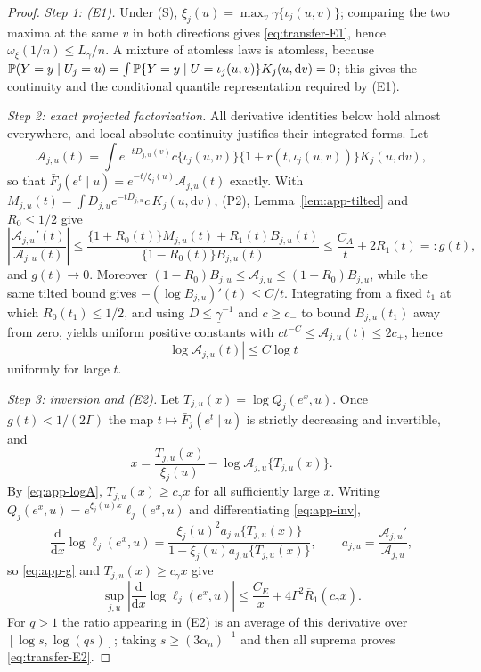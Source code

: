 \begin{proof}
\emph{Step 1: (E1).} Under (S), $\xi_j(u)=\max_v\gamma\{\iota_j(u,v)\}$;
comparing the two maxima at the same $v$ in both directions gives
\eqref{eq:transfer-E1}, hence $\omega_\xi(1/n)\le L_\gamma/n$. A mixture
of atomless laws is atomless, because
$\mathbb P(Y=y\mid U_j=u)=\int\mathbb P\{Y=y\mid U=\iota_j(u,v)\}K_j(u,\mathrm dv)=0$;
this gives the continuity and the conditional quantile representation
required by (E1).

\emph{Step 2: exact projected factorization.} All derivative identities
below hold almost everywhere, and local absolute continuity justifies
their integrated forms. Let
\[
 \mathcal A_{j,u}(t)=\int e^{-tD_{j,u}(v)}c\{\iota_j(u,v)\}
 \{1+r(t,\iota_j(u,v))\}K_j(u,\mathrm dv),
\]
so that $\bar F_j(e^t\mid u)=e^{-t/\xi_j(u)}\mathcal A_{j,u}(t)$
exactly. With $M_{j,u}(t)=\int D_{j,u}e^{-tD_{j,u}}c\,K_j(u,\mathrm dv)$,
(P2), Lemma~\ref{lem:app-tilted} and $R_0\le1/2$ give
\begin{equation}\label{eq:app-g}
 \left|\frac{\mathcal A_{j,u}'(t)}{\mathcal A_{j,u}(t)}\right|
 \le\frac{\{1+R_0(t)\}M_{j,u}(t)+R_1(t)B_{j,u}(t)}
         {\{1-R_0(t)\}B_{j,u}(t)}
 \le\frac{C_A}{t}+2R_1(t)=:g(t),
\end{equation}
and $g(t)\to0$. Moreover
$(1-R_0)B_{j,u}\le\mathcal A_{j,u}\le(1+R_0)B_{j,u}$, while the same
tilted bound gives $-(\log B_{j,u})'(t)\le C/t$. Integrating from a
fixed $t_1$ at which $R_0(t_1)\le1/2$, and using $D\le\underline\gamma^{-1}$
and $c\ge c_-$ to bound $B_{j,u}(t_1)$ away from zero, yields uniform
positive constants with $ct^{-C}\le\mathcal A_{j,u}(t)\le2c_+$, hence
\begin{equation}\label{eq:app-logA}
 |\log\mathcal A_{j,u}(t)|\le C\log t
\end{equation}
uniformly for large $t$.

\emph{Step 3: inversion and (E2).} Let
$T_{j,u}(x)=\log Q_j(e^x,u)$. Once $g(t)<1/(2\Gamma)$ the map
$t\mapsto\bar F_j(e^t\mid u)$ is strictly decreasing and invertible, and
\begin{equation}\label{eq:app-inv}
 x=\frac{T_{j,u}(x)}{\xi_j(u)}-\log\mathcal A_{j,u}\{T_{j,u}(x)\}.
\end{equation}
By \eqref{eq:app-logA}, $T_{j,u}(x)\ge c_\gamma x$ for all sufficiently
large $x$. Writing $Q_j(e^x,u)=e^{\xi_j(u)x}\ell_j(e^x,u)$ and
differentiating \eqref{eq:app-inv},
\[
 \frac{\mathrm d}{\mathrm dx}\log\ell_j(e^x,u)
 =\frac{\xi_j(u)^2a_{j,u}\{T_{j,u}(x)\}}
        {1-\xi_j(u)a_{j,u}\{T_{j,u}(x)\}},
 \qquad
 a_{j,u}=\frac{\mathcal A_{j,u}'}{\mathcal A_{j,u}},
\]
so \eqref{eq:app-g} and $T_{j,u}(x)\ge c_\gamma x$ give
\[
 \sup_{j,u}\left|\frac{\mathrm d}{\mathrm dx}\log\ell_j(e^x,u)\right|
 \le\frac{C_E}{x}+4\Gamma^2\overline R_1(c_\gamma x).
\]
For $q>1$ the ratio appearing in (E2) is an average of this derivative
over $[\log s,\log(qs)]$; taking $s\ge(3\alpha_n)^{-1}$ and then all
suprema proves \eqref{eq:transfer-E2}.


\end{proof}
